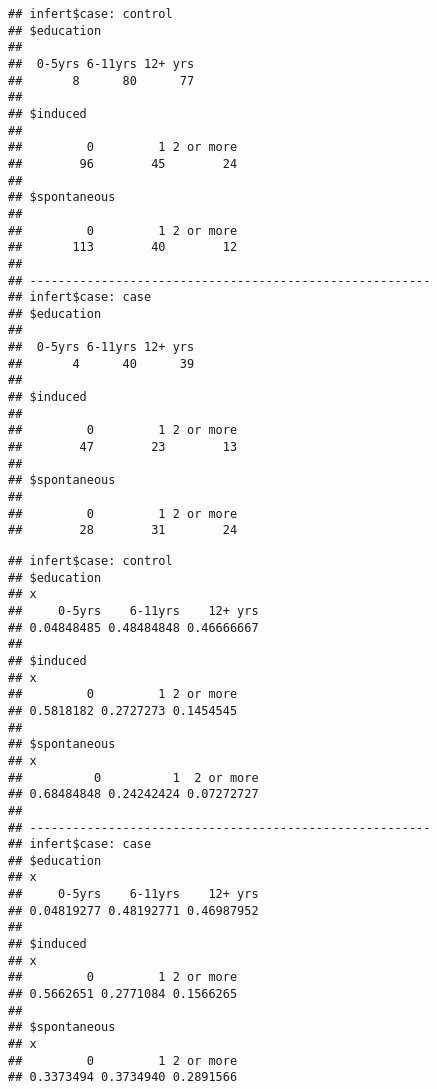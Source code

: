 \documentclass[]{book}
\newenvironment{Shaded}{\begin{snugshade}}{\end{snugshade}}
\newcommand{\KeywordTok}[1]{\textcolor[rgb]{0.13,0.29,0.53}{\textbf{{#1}}}}
\newcommand{\DecValTok}[1]{\textcolor[rgb]{0.00,0.00,0.81}{{#1}}}
\newcommand{\StringTok}[1]{\textcolor[rgb]{0.31,0.60,0.02}{{#1}}}
\newcommand{\NormalTok}[1]{{#1}}
\theoremstyle{definition}
\theoremstyle{definition}
\theoremstyle{remark}
\begin{document}
\begin{verbatim}
## infert$case: control
## $education
## 
##  0-5yrs 6-11yrs 12+ yrs 
##       8      80      77 
## 
## $induced
## 
##         0         1 2 or more 
##        96        45        24 
## 
## $spontaneous
## 
##         0         1 2 or more 
##       113        40        12 
## 
## -------------------------------------------------------- 
## infert$case: case
## $education
## 
##  0-5yrs 6-11yrs 12+ yrs 
##       4      40      39 
## 
## $induced
## 
##         0         1 2 or more 
##        47        23        13 
## 
## $spontaneous
## 
##         0         1 2 or more 
##        28        31        24
\end{verbatim}

\begin{Shaded}
\end{Shaded}

\begin{verbatim}
## infert$case: control
## $education
## x
##     0-5yrs    6-11yrs    12+ yrs 
## 0.04848485 0.48484848 0.46666667 
## 
## $induced
## x
##         0         1 2 or more 
## 0.5818182 0.2727273 0.1454545 
## 
## $spontaneous
## x
##          0          1  2 or more 
## 0.68484848 0.24242424 0.07272727 
## 
## -------------------------------------------------------- 
## infert$case: case
## $education
## x
##     0-5yrs    6-11yrs    12+ yrs 
## 0.04819277 0.48192771 0.46987952 
## 
## $induced
## x
##         0         1 2 or more 
## 0.5662651 0.2771084 0.1566265 
## 
## $spontaneous
## x
##         0         1 2 or more 
## 0.3373494 0.3734940 0.2891566
\end{verbatim}

\begin{Shaded}
\end{Shaded}
\end{document}
